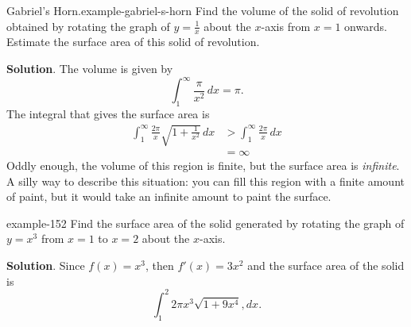 \documentclass[10pt,]{book}
\numberwithin{equation}{section}
\newcommand{\gt}{>}
\newcommand{\amp}{&}
\begin{document}
\begin{example}{Gabriel's Horn.}{example-gabriel-s-horn}%
\hypertarget{p-671}{}%
Find the volume of the solid of revolution obtained by rotating the graph of \(y = \frac{1}{x}\) about the \(x\)-axis from \(x = 1\) onwards. Estimate the surface area of this solid of revolution.%
\par\smallskip%
\noindent\textbf{Solution}.\hypertarget{solution-147}{}\quad%
\hypertarget{p-672}{}%
The volume is given by%
\begin{equation*}
\int_{1}^{\infty}\frac{\pi}{x^{2}}\,dx = \pi\text{.}
\end{equation*}
The integral that gives the surface area is%
%
\begin{align*}
\int_{1}^{\infty}\frac{2\pi}{x}\sqrt{1 + \frac{1}{x^{2}}}\,dx \amp \gt \int_{1}^{\infty}\frac{2\pi}{x}\,dx \\
\amp = \infty 
\end{align*}
\hypertarget{p-673}{}%
Oddly enough, the volume of this region is finite, but the surface area is \emph{infinite}. A silly way to describe this situation: you can fill this region with a finite amount of paint, but it would take an infinite amount to paint the surface.%
\end{example}
\begin{example}{}{example-152}%
\hypertarget{p-674}{}%
Find the surface area of the solid generated by rotating the graph of \(y=x^{3}\) from \(x=1\) to \(x=2\) about the \(x\)-axis.%
\par\smallskip%
\noindent\textbf{Solution}.\hypertarget{solution-148}{}\quad%
\hypertarget{p-675}{}%
Since \(f(x)=x^{3}\), then \(f'(x)=3x^{2}\) and the surface area of the solid is%
\begin{equation*}
\int_{1}^{2}2\pi x^{3}\sqrt{1+9x^{4}},dx.
\end{equation*}
%
\end{example}
%
%
\typeout{************************************************}
\typeout{************************************************}
%
\end{document}
